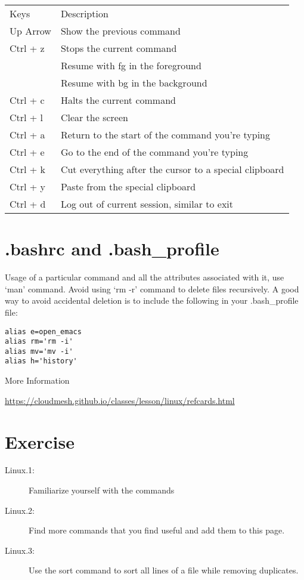 \begin{tabular}{ll}
Keys     & Description  \\
Up Arrow & Show the previous command\\
Ctrl + z & Stops the current command  \\
         & Resume with fg in the foreground \\
         & Resume with bg in the background \\
Ctrl + c & Halts the current command\\
Ctrl + l & Clear the screen\\
Ctrl + a & Return to the start of the command you're typing\\
Ctrl + e & Go to the end of the command you're typing\\
Ctrl + k & Cut everything after the cursor to a special clipboard\\
Ctrl + y & Paste from the special clipboard \\
Ctrl + d & Log out of current session, similar to exit \\
\end{tabular}

\section{.bashrc and .bash\_profile}\label{bashrc-and-.bash_profile}

Usage of a particular command and all the attributes associated with it,
use `man' command. Avoid using `rm -r' command to delete files
recursively. A good way to avoid accidental deletion is to include the
following in your .bash\_profile file:

\begin{verbatim}
alias e=open_emacs
alias rm='rm -i'
alias mv='mv -i' 
alias h='history'
\end{verbatim}

More Information

\url{https://cloudmesh.github.io/classes/lesson/linux/refcards.html}

\section{Exercise}\label{exercise}

\begin{description}
\item[Linux.1:]
Familiarize yourself with the commands
\item[Linux.2:]
Find more commands that you find useful and add them to this page.
\item[Linux.3:]
Use the sort command to sort all lines of a file while removing
duplicates.
\end{description}
